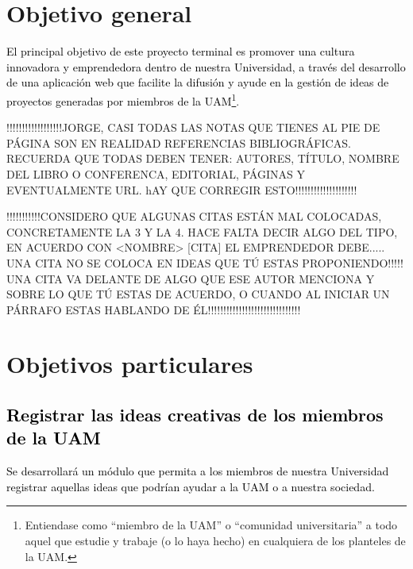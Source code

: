 \documentclass[11pt,letterpaper,titlepage]{article}
\begin{document}
\section{Objetivo general}
\textcolor{black}{El principal objetivo de este proyecto terminal es promover una cultura innovadora y emprendedora dentro de nuestra Universidad, a trav\'es del desarrollo de una aplicaci\'on web que facilite la difusi\'on y ayude en la gesti\'on de ideas de proyectos generadas por miembros de la UAM}\footnote{Entiendase como ``miembro de la UAM'' o ``comunidad universitaria'' a todo aquel que estudie y trabaje (o lo haya hecho) en cualquiera de los planteles de la UAM.}.

!!!!!!!!!!!!!!!!!!JORGE, CASI TODAS LAS NOTAS QUE TIENES AL PIE DE P\'AGINA SON EN REALIDAD REFERENCIAS BIBLIOGR\'AFICAS. RECUERDA QUE TODAS DEBEN TENER: AUTORES, T\'ITULO, NOMBRE DEL LIBRO O CONFERENCA, EDITORIAL, P\'AGINAS Y EVENTUALMENTE URL. hAY QUE CORREGIR ESTO!!!!!!!!!!!!!!!!!!!!

!!!!!!!!!!!CONSIDERO QUE ALGUNAS CITAS EST\'AN MAL COLOCADAS, CONCRETAMENTE LA 3 Y LA 4. HACE FALTA DECIR ALGO DEL TIPO, EN ACUERDO CON <NOMBRE> [CITA] EL EMPRENDEDOR DEBE..... UNA CITA NO SE COLOCA EN IDEAS QUE T\'U ESTAS PROPONIENDO!!!!! UNA CITA VA DELANTE DE ALGO QUE ESE AUTOR MENCIONA Y SOBRE LO QUE T\'U ESTAS DE ACUERDO, O CUANDO AL INICIAR UN P\'ARRAFO ESTAS HABLANDO DE \'EL!!!!!!!!!!!!!!!!!!!!!!!!!!!!!!


\section{Objetivos particulares}
\textcolor{black}{
\subsection{Registrar las ideas creativas de los miembros de la UAM}
Se desarrollar\'a un m\'odulo que permita a los miembros de nuestra Universidad registrar aquellas ideas que podr\'ian ayudar a la UAM o a nuestra sociedad. }
\end{document}
